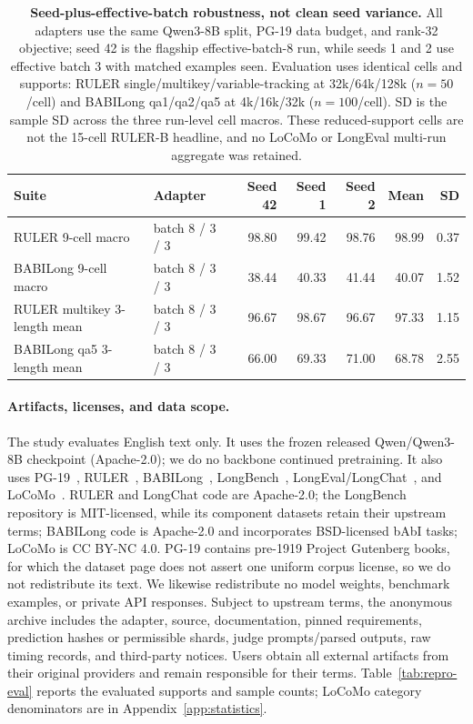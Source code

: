 \begin{table}[!t]
\centering
\scriptsize
\setlength{\tabcolsep}{4pt}
\begin{tabular}{@{}llrrrrr@{}}
\toprule
\textbf{Suite} & \textbf{Adapter} & \textbf{Seed 42} & \textbf{Seed 1} &
\textbf{Seed 2} & \textbf{Mean} & \textbf{SD} \\
\midrule
RULER 9-cell macro & batch 8 / 3 / 3 & 98.80 & 99.42 & 98.76 & 98.99 & 0.37 \\
BABILong 9-cell macro & batch 8 / 3 / 3 & 38.44 & 40.33 & 41.44 & 40.07 & 1.52 \\
\midrule
RULER multikey 3-length mean & batch 8 / 3 / 3 & 96.67 & 98.67 & 96.67 & 97.33 & 1.15 \\
BABILong qa5 3-length mean & batch 8 / 3 / 3 & 66.00 & 69.33 & 71.00 & 68.78 & 2.55 \\
\bottomrule
\end{tabular}
\caption{\textbf{Seed-plus-effective-batch robustness, not clean seed
variance.} All adapters use the same Qwen3-8B split, PG-19 data budget, and
rank-32 objective; seed 42 is the flagship effective-batch-8 run, while seeds
1 and 2 use effective batch 3 with matched examples seen. Evaluation uses
identical cells and supports: RULER single/multikey/variable-tracking at
32k/64k/128k ($n{=}50$/cell) and BABILong qa1/qa2/qa5 at
4k/16k/32k ($n{=}100$/cell). SD is the sample SD across the three run-level
cell macros. These reduced-support cells are not the 15-cell RULER-B headline,
and no LoCoMo or LongEval multi-run aggregate was retained.}
\label{tab:seed-batch-robustness}
\end{table}

\paragraph{Artifacts, licenses, and data scope.}
The study evaluates English text only. It uses the frozen released
Qwen/Qwen3-8B checkpoint (Apache-2.0); we do no backbone continued pretraining.
It also uses PG-19~\citep{pg19}, RULER~\citep{ruler}, BABILong~\citep{babilong},
LongBench~\citep{longbench}, LongEval/LongChat~\citep{longchat}, and
LoCoMo~\citep{locomo}. RULER and LongChat code are Apache-2.0; the LongBench
repository is MIT-licensed, while its component datasets retain their upstream
terms; BABILong code is Apache-2.0 and incorporates BSD-licensed bAbI tasks;
LoCoMo is CC BY-NC 4.0. PG-19 contains pre-1919 Project Gutenberg books, for
which the dataset page does not assert one uniform corpus license, so we do not
redistribute its text. We likewise redistribute no model weights, benchmark
examples, or private API responses. Subject to upstream terms, the anonymous
archive includes the adapter, source, documentation, pinned requirements,
prediction hashes or permissible shards, judge prompts/parsed outputs, raw
timing records, and third-party notices. Users obtain all external artifacts
from their original providers and remain
responsible for their terms. Table~\ref{tab:repro-eval} reports the evaluated
supports and sample counts; LoCoMo category denominators are in
Appendix~\ref{app:statistics}.


